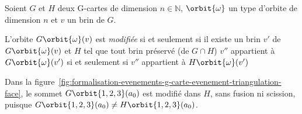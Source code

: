 \begin{definition}
	Soient $G$ et $H$ deux G-cartes de dimension $n \in \mathbb{N}$,
	$\orbit{\omega}$ un type d'orbite de dimension $n$ et $v$ un brin de $G$. %

	L'orbite $G\orbit{\omega}(v)$ est \emph{modifiée} si et seulement si il existe un brin $v'$ de
	$G\orbit{\omega}(v)$ et $H$ tel que tout brin préservé (de $G \cap H$) $v''$ appartient à $G\orbit{\omega}(v')$ si et seulement si $v''$ appartient à $H\orbit{\omega}(v')$%
\end{definition}

Dans la
figure~\ref{fig:formalisation-evenements-g-carte-evenement-triangulation-face},
le sommet $G\orbit{1,2,3}(a_{0})$ est modifié dans $H$, sans fusion ni scission, puisque
$G\orbit{1,2,3}(a_{0}) \neq H\orbit{1,2,3}(a_{0})$. %






